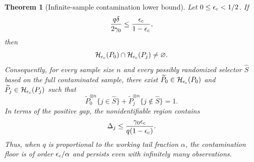 \documentclass[11pt]{article}
\newtheorem{theorem}{Theorem}[section]
\theoremstyle{remark}
\begin{document}
\begin{theorem}[Infinite-sample contamination lower bound]
\label{thm:w3-contam-lower}
Let $0\le\epsilon_{\rm c}<1/2$.  If
\begin{equation}
 \frac{q\delta}{2\gamma_0}
 \le\frac{\epsilon_{\rm c}}{1-\epsilon_{\rm c}},
 \label{eq:w3-contam-overlap-condition}
\end{equation}
then
\begin{equation}
 \mathcal H_{\epsilon_{\rm c}}(P_0)
 \cap
 \mathcal H_{\epsilon_{\rm c}}(P_j)
 \ne\varnothing.
 \label{eq:w3-contam-overlap}
\end{equation}
Consequently, for every sample size $n$ and every possibly randomized selector
$\widehat S$ based on the full contaminated sample, there exist
$\widetilde P_0\in\mathcal H_{\epsilon_{\rm c}}(P_0)$ and
$\widetilde P_j\in\mathcal H_{\epsilon_{\rm c}}(P_j)$ such that
\begin{equation}
 \widetilde P_0^{\otimes n}\{j\in\widehat S\}
 +\widetilde P_j^{\otimes n}\{j\notin\widehat S\}=1.
 \label{eq:w3-contam-risk}
\end{equation}
In terms of the positive gap, the nonidentifiable region contains
\begin{equation}
 \Delta_j\le
 \frac{\gamma_0\epsilon_{\rm c}}
      {q(1-\epsilon_{\rm c})}.
 \label{eq:w3-contam-gap-floor}
\end{equation}
Thus, when $q$ is proportional to the working tail fraction $\alpha$, the
contamination floor is of order $\epsilon_{\rm c}/\alpha$ and persists even
with infinitely many observations.
\end{theorem}
\end{document}
